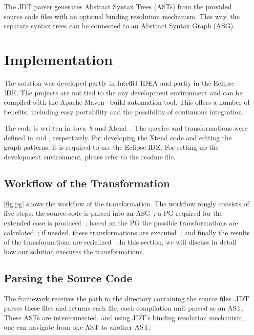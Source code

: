 \documentclass[submission,copyright,creativecommons]{eptcs}
\begin{document}
The JDT parser generates Abstract Syntax Trees (ASTs) from the provided source code files with an optional binding resolution mechanism. This way, the separate syntax trees can be connected to an Abstract Syntax Graph (ASG).



\section{Implementation}

The solution was developed partly in IntelliJ IDEA and partly in the Eclipse IDE. The projects are not tied to the any development environment and can be compiled with the Apache Maven~\cite{Maven} build automation tool. This offers a number of benefits, including easy portability and the possibility of continuous integration.

The code is written in Java~8 and Xtend~\cite{Xtend}. The queries and transformations were defined in \eiq and \viatra, respectively. For developing the Xtend code and editing the graph patterns, it is required to use the Eclipse IDE. For setting up the development environment, please refer to the readme file. 

\subsection{Workflow of the Transformation}


\noindent\autoref{fig:pg} shows the workflow of the transformation. The workflow rougly consists of five steps: the source code is parsed into an ASG~; a PG required for the extended case is produced~; based on the PG the possible transformations are calculated~; if needed, these transformations are executed~; and finally the results of the transformations are serialized~. In this section, we will discuss in detail how our solution executes the transformations.

\subsection[Parsing the Source Code]{Parsing the Source Code\qquad{}}
The framework receives the path to the directory containing the source files. JDT parses these files and returns each file, each compilation unit parsed as an AST. These ASTs are interconnected, and using JDT's binding resolution mechanism, one can navigate from one AST to another AST.
\end{document}
